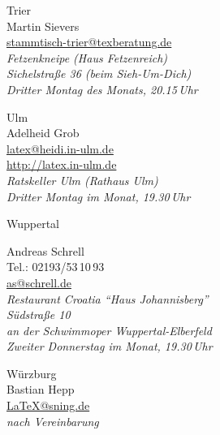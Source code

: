 \begin{multicols}{2}
\begin{roll}
   \item[Trier]  \ \\
     Martin Sievers\\
     \url{stammtisch-trier@texberatung.de}\\
     \emph{Fetzenkneipe (Haus Fetzenreich)\\
       Sichelstraße 36 (beim Sieh-Um-Dich)\\
       Dritter Montag des Monats, 20.15\,Uhr}

%

  \item[Ulm]  \ \\
    Adelheid Grob\\
    \url{latex@heidi.in-ulm.de}\\
    \url{http://latex.in-ulm.de}\\
    \emph{Ratskeller Ulm (Rathaus Ulm)\\
      Dritter Montag im Monat, 19.30\,Uhr}
%
   \item[Wuppertal]  \ \\\raggedright
    Andreas Schrell\\                  %
    Tel.: 02193/53\,10\,93\\
    \url{as@schrell.de}\\
    \emph{Restaurant Croatia "`Haus Johannisberg"'\\
      Südstraße 10\\
      an der Schwimmoper Wuppertal-Elberfeld\\
      Zweiter Donnerstag im Monat, 19.30\,Uhr}%
%
  \item[W\"urzburg]  \ \\
    Bastian Hepp\\
    \url{LaTeX@sning.de}\\
    \emph{nach Vereinbarung}
%
%
  \end{roll}%
\end{multicols}%
\egroup

